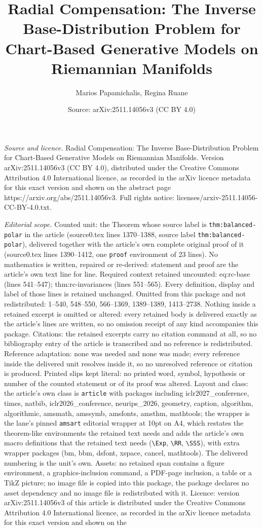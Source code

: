 \documentclass[10pt,a4paper]{amsart}
\title[Radial Compensation: The Inverse Base-Distribution Problem f]{Radial Compensation: The Inverse Base-Distribution Problem for Chart-Based Generative Models on Riemannian Manifolds}
\author{Marios Papamichalis, Regina Ruane}
\date{Source: arXiv:2511.14056v3 (CC BY 4.0)}
\begin{document}
\maketitle

\noindent\emph{Source and licence.} Radial Compensation: The Inverse Base-Distribution Problem for Chart-Based Generative Models on Riemannian Manifolds. Version arXiv:2511.14056v3 (CC BY 4.0), distributed under the Creative Commons Attribution 4.0 International licence, as recorded in the arXiv licence metadata for this exact version and shown on the abstract page https://arxiv.org/abs/2511.14056v3. Full rights notice: licenses/arxiv-2511.14056-CC-BY-4.0.txt.\par\smallskip

\noindent\textit{Editorial scope.} Counted unit: the Theorem whose source label is \texttt{thm:balanced-polar} in the article (source0.tex lines 1370--1388, source label \texttt{thm:balanced-polar}), delivered together with the article's own complete original proof of it (source0.tex lines 1390--1412, one \texttt{proof} environment of 23 lines). No mathematics is written, repaired or re-derived: statement and proof are the article's own text line for line. Required context retained uncounted: eq:rc-base (lines 541--547); thm:rc-invariances (lines 551--565). Every definition, display and label of those lines is retained unchanged. Omitted from this package and not redistributed: 1--540, 548--550, 566--1369, 1389--1389, 1413--2738. Nothing inside a retained excerpt is omitted or altered: every retained body is delivered exactly as the article's lines are written, so no omission receipt of any kind accompanies this package. Citations: the retained excerpts carry no citation command at all, so no bibliography entry of the article is transcribed and no reference is redistributed. Reference adaptation: none was needed and none was made; every reference inside the delivered unit resolves inside it, so no unresolved reference or citation is produced. Printed slips kept literal: no printed word, symbol, hypothesis or number of the counted statement or of its proof was altered. Layout and class: the article's own class is \texttt{article} with packages including iclr2027\_conference, times, natbib, iclr2026\_conference, neurips\_2026, geometry, caption, algorithm, algorithmic, amsmath, amssymb, amsfonts, amsthm, mathtools; the wrapper is the lane's pinned \texttt{amsart} editorial wrapper at 10pt on A4, which restates the theorem-like environments the retained text needs and adds the article's own macro definitions that the retained text needs (\texttt{\textbackslash Exp}, \texttt{\textbackslash RR}, \texttt{\textbackslash SSS}), with extra wrapper packages (bm, bbm, dsfont, xspace, cancel, mathtools). The delivered numbering is the unit's own. Assets: no retained span contains a figure environment, a graphics-inclusion command, a PDF-page inclusion, a table or a TikZ picture; no image file is copied into this package, the package declares no asset dependency and no image file is redistributed with it. Licence: version arXiv:2511.14056v3 of this article is distributed under the Creative Commons Attribution 4.0 International licence, as recorded in the arXiv licence metadata for this exact version and shown on the 
\end{document}
